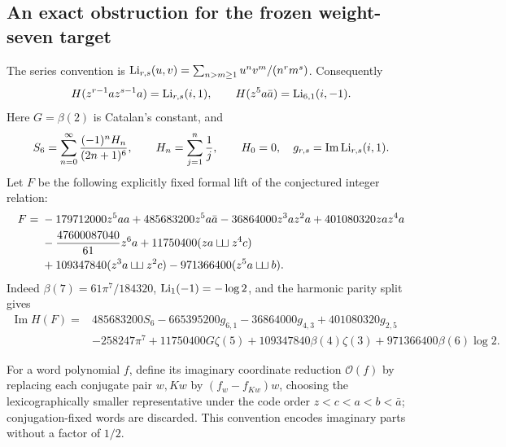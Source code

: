\subsection{An exact obstruction for the frozen weight-seven target}

The series convention is
$\operatorname{Li}_{r,s}(u,v)=\sum_{n>m\ge1}u^nv^m/(n^rm^s)$.  Consequently
\[
 H(z^{r-1}a z^{s-1}a)=\operatorname{Li}_{r,s}(i,1),\qquad
 H(z^5a\bar a)=\operatorname{Li}_{6,1}(i,-1).
\]
Here $G=\beta(2)$ is Catalan's constant, and
\[
 S_6=\sum_{n=0}^{\infty}\frac{(-1)^nH_n}{(2n+1)^6},\qquad
 H_n=\sum_{j=1}^{n}\frac1j,\qquad H_0=0,
 \quad g_{r,s}=\operatorname{Im}\operatorname{Li}_{r,s}(i,1).
\]
Let $F$ be the following explicitly fixed formal lift of the conjectured
integer relation:
\begin{align}
 F={}&-179712000z^5aa+485683200z^5a\bar a
       -36864000z^3az^2a+401080320zaz^4a\notag\\
 &-\frac{47600087040}{61}z^6a
       +11750400(za\mathbin{\sqcup\!\sqcup}z^4c)\notag\\
 &+109347840(z^3a\mathbin{\sqcup\!\sqcup}z^2c)
       -971366400(z^5a\mathbin{\sqcup\!\sqcup}b).
 \label{cay:eq:target}
\end{align}
Indeed $\beta(7)=61\pi^7/184320$, $\operatorname{Li}_1(-1)=-\log2$, and the
harmonic parity split gives
\begin{align*}
 \operatorname{Im}H(F)={}&485683200S_6-665395200g_{6,1}
 -36864000g_{4,3}+401080320g_{2,5}\\
 &-258247\pi^7+11750400G\zeta(5)
 +109347840\beta(4)\zeta(3)+971366400\beta(6)\log2.
\end{align*}

For a word polynomial $f$, define its imaginary coordinate reduction
$\mathcal O(f)$ by replacing each conjugate pair $w,Kw$ by
$(f_w-f_{Kw})w$, choosing the lexicographically smaller representative
under the code order $z<c<a<b<\bar a$; conjugation-fixed words are
discarded.  This convention encodes imaginary parts without a factor
of $1/2$.


